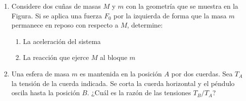 \documentclass[letterpaper,11pt]{article}
\begin{document}
\begin{enumerate}
\item Considere dos cuñas de masas $M$ y $m$ con la geometría que se muestra en la Figura. Si se aplica una fuerza $F_0$ por la izquierda de forma que la masa $m$ permanece en reposo con respecto a $M$, determine:
    \begin{enumerate}
        \item La aceleración del sistema
        \item La reacción que ejerce $M$ al bloque $m$ 
    \end{enumerate}
    
\begin{figure}[H]
    \centering
    
\end{figure}

\item Una esfera de masa $m$ es mantenida en la posición $A$ por dos cuerdas. Sea $T_A$ la tensión de la cuerda indicada. Se corta la cuerda horizontal y el péndulo oscila hasta la posición $B$. ¿Cuál es la razón de las tensiones $T_B/T_A$?

\begin{figure}[H]
    \centering
    
\end{figure}



%   

\end{enumerate}
\end{document}
